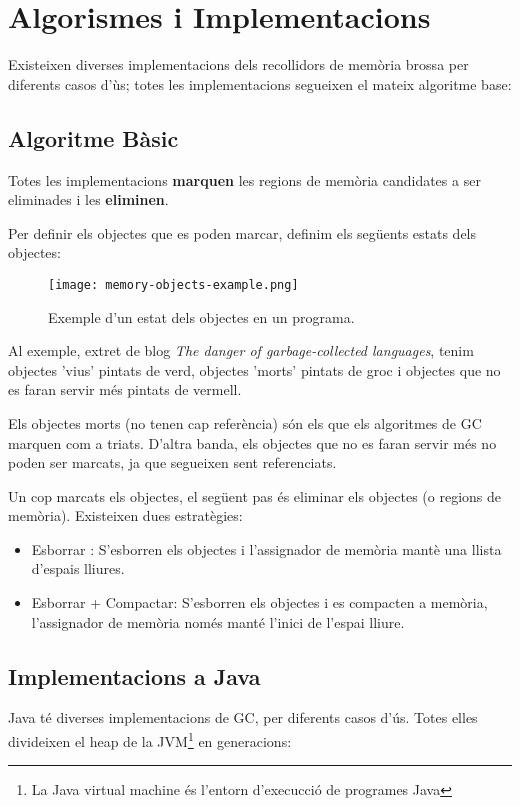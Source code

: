 \section{Algorismes i Implementacions}
Existeixen diverses implementacions dels recollidors de memòria brossa per diferents casos d'ùs; totes les implementacions segueixen el mateix algoritme base: 

\subsection{Algoritme Bàsic}
Totes les implementacions \textbf{marquen} les regions de memòria candidates a ser eliminades i les \textbf{eliminen}.

Per definir els objectes que es poden marcar, definim els següents estats dels objectes:

\begin{figure}[h]
    \centering
    \texttt{[image: memory-objects-example.png]}
    \caption{Exemple d'un estat dels objectes en un programa.}
\end{figure}

Al exemple, extret de blog \textit{The danger of garbage-collected languages}\cite{gbProblems}, tenim objectes 'vius' pintats de verd, objectes 'morts' pintats de groc i objectes que no es faran servir més pintats de vermell.

Els objectes morts (no tenen cap referència) són els que els algoritmes de GC marquen com a triats. D'altra banda, els objectes que no es faran servir més no poden ser marcats, ja que segueixen sent referenciats.

Un cop marcats els objectes, el següent pas és eliminar els objectes (o regions de memòria). Existeixen dues estratègies:

\begin{itemize}
    \item Esborrar : S'esborren els objectes i l'assignador de memòria mantè una llista d'espais lliures.
    \item Esborrar + Compactar: S'esborren els objectes i es compacten a memòria, l'assignador de memòria només manté l'inici de l'espai lliure.
\end{itemize}


\subsection{Implementacions a Java}

Java té diverses implementacions de GC, per diferents casos d'ús. Totes elles divideixen el heap de la JVM\footnote{La Java virtual machine és l'entorn d'execucció de programes Java} en generacions:

